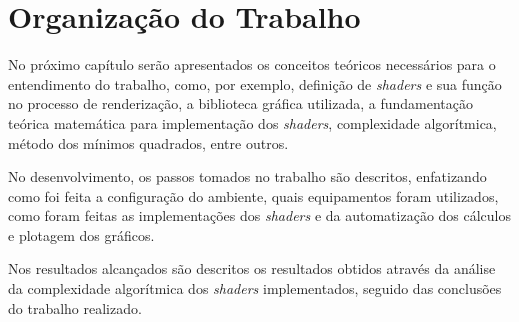 \section{Organização do Trabalho}

	No próximo capítulo serão apresentados os conceitos teóricos necessários para o entendimento do trabalho, como, por exemplo, definição de \textit{shaders} e sua função no processo de renderização, a biblioteca gráfica utilizada,  a fundamentação teórica matemática para implementação dos \textit{shaders}, complexidade algorítmica, método dos mínimos quadrados, entre outros. 

	No desenvolvimento, os passos tomados no trabalho são descritos, enfatizando como foi feita a configuração do ambiente, quais equipamentos foram utilizados, como foram feitas as implementações dos \textit{shaders} e da automatização dos cálculos e plotagem dos gráficos.

	Nos resultados alcançados são descritos os resultados obtidos através da análise da complexidade algorítmica dos \textit{shaders} implementados, seguido das conclusões do trabalho realizado.   